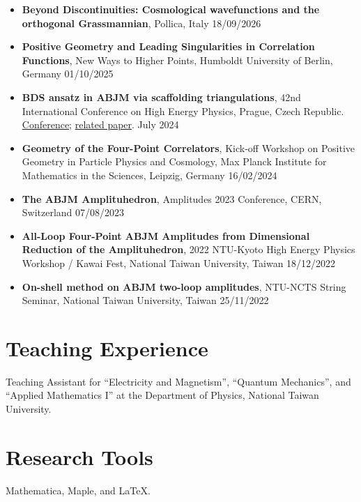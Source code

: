 \documentclass[10pt,a4paper]{article}
\newcommand{\cvdate}[1]{\hfill{\color{muted}#1}}
\begin{document}
\begin{itemize}
  \item \textbf{Beyond Discontinuities: Cosmological wavefunctions and the orthogonal Grassmannian}, Pollica, Italy \cvdate{18/09/2026}

  \item \textbf{Positive Geometry and Leading Singularities in Correlation Functions}, New Ways to Higher Points, Humboldt University of Berlin, Germany \cvdate{01/10/2025}

  \item \textbf{BDS ansatz in ABJM via scaffolding triangulations}, 42nd International Conference on High Energy Physics, Prague, Czech Republic. \href{https://indico.cern.ch/event/1291157/}{Conference}; \href{https://arxiv.org/abs/2510.20663}{related paper}. \cvdate{July 2024}

  \item \textbf{Geometry of the Four-Point Correlators}, Kick-off Workshop on Positive Geometry in Particle Physics and Cosmology, Max Planck Institute for Mathematics in the Sciences, Leipzig, Germany \cvdate{16/02/2024}

  \item \textbf{The ABJM Amplituhedron}, Amplitudes 2023 Conference, CERN, Switzerland \cvdate{07/08/2023}

  \item \textbf{All-Loop Four-Point ABJM Amplitudes from Dimensional Reduction of the Amplituhedron}, 2022 NTU-Kyoto High Energy Physics Workshop / Kawai Fest, National Taiwan University, Taiwan \cvdate{18/12/2022}

  \item \textbf{On-shell method on ABJM two-loop amplitudes}, NTU-NCTS String Seminar, National Taiwan University, Taiwan \cvdate{25/11/2022}
\end{itemize}

\section{Teaching Experience}

Teaching Assistant for ``Electricity and Magnetism'', ``Quantum Mechanics'', and ``Applied Mathematics I'' at the Department of Physics, National Taiwan University.

\section{Research Tools}

Mathematica, Maple, and LaTeX.
\end{document}
